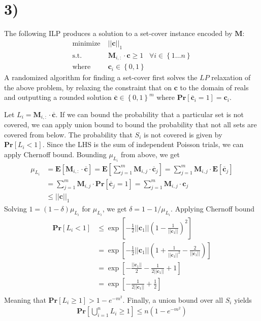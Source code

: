 \documentclass[12pt]{article}
\begin{document}
\section*{3)}
The following ILP produces a solution to a set-cover instance encoded by $\mathbf{M}$:
\begin{align*}
\text{minimize} \;& ||\mathbf{c}||_1 \\
\text{s.t.} \;& \mathbf{M}_{i,:} \cdot \mathbf{c} \geq 1 \; \; \; \forall i \in \left\{ 1 \hdots n \right\} \\
\text{where} \;& \mathbf{c}_i \in \left\{ 0,1 \right\}
\end{align*}
A randomized algorithm for finding a set-cover first solves the $LP$ relaxation of the above problem, by relaxing the constraint that on $\mathbf{c}$ to the domain of reals and outputting a rounded solution $\overline{\mathbf{c}} \in \left\{ 0,1 \right\}^m$ where $\mathbf{Pr}\left[\overline{\mathbf{c}}_i = 1 \right] = \mathbf{c}_i$.

Let $L_i = \mathbf{M}_{i,:} \cdot \overline{ \mathbf{c} }$. If we can bound the probability that a particular set is not covered, we can apply union bound to bound the probability that not all sets are covered from below. The probability that $S_i$ is not covered is given by $\mathbf{Pr}\left[ L_i < 1 \right]$. Since the LHS is the sum of independent Poisson trials, we can apply Chernoff bound. Bounding $\mu_{L_i}$ from above, we get
\begin{align*}
\mu_{L_i} &= \mathbf{E}\left[ \mathbf{M}_{i,:} \cdot \overline{\mathbf{c}} \right] = \mathbf{E}\left[ \sum_{j=1}^{m} \mathbf{M}_{i,j} \cdot \overline{\mathbf{c}}_j \right] = \sum_{j=1}^{m} \mathbf{M}_{i,j} \cdot \mathbf{E}\left[ \overline{\mathbf{c}}_j \right] \\
&= \sum_{j=1}^{m} \mathbf{M}_{i,j} \cdot \mathbf{Pr}\left[ \overline{\mathbf{c}}_j = 1 \right] = \sum_{j=1}^{m} \mathbf{M}_{i,j} \cdot \mathbf{c}_j \\
&\leq || \mathbf{c} ||_1
\end{align*} 
Solving $1 = (1-\delta)\mu_{L_i}$ for $\mu_{L_i}$, we get $\delta = 1-1/\mu_{L_i}$. Applying Chernoff bound
\begin{align*}
\mathbf{Pr}\left[ L_i < 1 \right] &\leq \exp \left[ -\frac{1}{2}||\mathbf{c}_1|| \left( 1-\frac{1}{||\mathbf{c}_1||} \right)^2 \right] \\
&= \exp \left[ -\frac{1}{2}||\mathbf{c}_1|| \left( 1+\frac{1}{||\mathbf{c}_1||^2} - \frac{2}{||\mathbf{c}_1||} \right) \right] \\
&= \exp \left[ -\frac{||\mathbf{c}_1||}{2}-\frac{1}{2||\mathbf{c}_1||} + 1 \right]  \\
&= \exp \left[ -\frac{1}{2||\mathbf{c}_1||} + \frac{1}{2} \right]  \\
\end{align*}
Meaning that $\mathbf{Pr}\left[ L_i \geq 1 \right] > 1-e^{-m^2}$. Finally, a union bound over all $S_i$ yields
\begin{align*}
\mathbf{Pr}\left[ \bigcup_{i=1}^{n} L_i \geq 1 \right] \leq n (1-e^{-m^2})
\end{align*}
\end{document}
